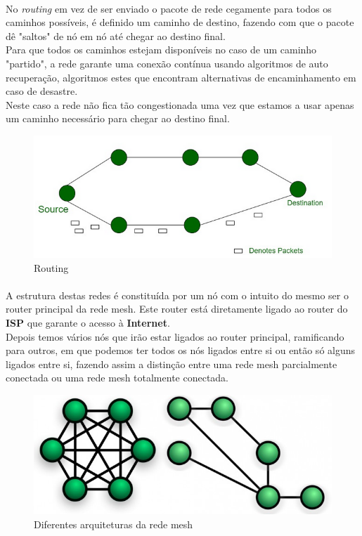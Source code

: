 \documentclass[letterpaper, 11pt]{article}
\begin{document}
\paragraph{}
No \emph{routing} em vez de ser enviado o pacote de rede cegamente para todos os caminhos possíveis, é
definido um caminho de destino, fazendo com que o pacote dê "saltos" de nó em nó até chegar ao
destino final.\\
Para que todos os caminhos estejam disponíveis no caso de um caminho "partido", a rede garante
uma conexão contínua usando algoritmos de auto recuperação, algoritmos estes que encontram alternativas
de encaminhamento em caso de desastre.\\
Neste caso a rede não fica tão congestionada uma vez que estamos a usar apenas um caminho necessário
para chegar ao destino final.

\begin{figure}[htbp]
\centering
\includegraphics[width=.9\linewidth]{imagens/routing.png}
\caption{Routing}
\end{figure}

\paragraph{}
A estrutura destas redes é constituída por um nó com o intuito do mesmo ser o router principal da rede
mesh. Este router está diretamente ligado ao router do \textbf{ISP} que garante o acesso à \textbf{Internet}.\\
Depois temos vários nós que irão estar ligados ao router principal, ramificando para outros, em que podemos
ter todos os nós ligados entre si ou então só alguns ligados entre si, fazendo assim a distinção entre
uma rede mesh parcialmente conectada ou uma rede mesh totalmente conectada.

\begin{figure}[htbp]
\centering
\includegraphics[width=.9\linewidth]{imagens/fully-partial.jpeg}
\caption{Diferentes arquiteturas da rede mesh}
\end{figure}
\end{document}
